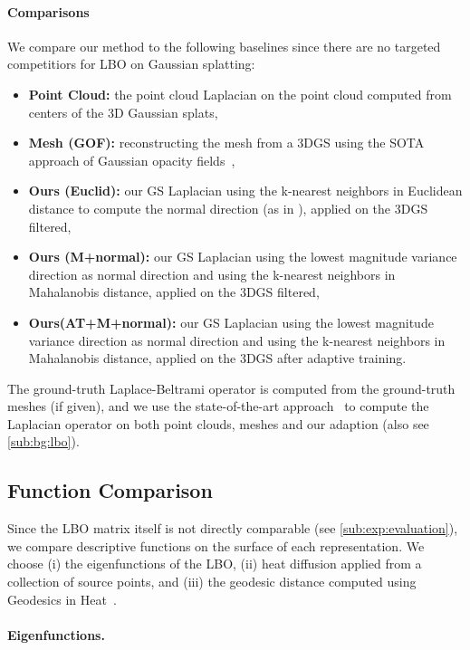 \paragraph{Comparisons}
We compare our method to the following baselines since there are no targeted competitiors for LBO on Gaussian splatting:
\begin{itemize}
    \item \textbf{Point Cloud:} the point cloud Laplacian on the point cloud computed from centers of the 3D Gaussian splats,
    \item \textbf{Mesh (GOF):} reconstructing the mesh from a 3DGS using the SOTA approach of Gaussian opacity fields~\cite{yu2024gaussian},
    \item \textbf{Ours (Euclid):} our GS Laplacian using the k-nearest neighbors in Euclidean distance to compute the normal direction (as in \cite{sharp2020nonmanifold}), applied on the 3DGS filtered,
    \item \textbf{Ours (M+normal):} our GS Laplacian using the lowest magnitude variance direction as normal direction and using the k-nearest neighbors in Mahalanobis distance, applied on the 3DGS filtered,
    \item \textbf{Ours(AT+M+normal):} our GS Laplacian using the lowest magnitude variance direction as normal direction and using the k-nearest neighbors in Mahalanobis distance, applied on the 3DGS after adaptive training.
\end{itemize}
The ground-truth Laplace-Beltrami operator is computed from the ground-truth meshes (if given), and we use the state-of-the-art approach~\cite{sharp2020nonmanifold} to compute the Laplacian operator on both point clouds, meshes and our adaption (also see \cref{sub:bg:lbo}). 

\subsection{Function Comparison}

Since the LBO matrix itself is not directly comparable (see \cref{sub:exp:evaluation}), we compare descriptive functions on the surface of each representation. 
We choose (i) the eigenfunctions of the LBO, (ii) heat diffusion applied from a collection of source points, and (iii) the geodesic distance computed using Geodesics in Heat~\cite{crane2017heat}.

\paragraph{Eigenfunctions. }

